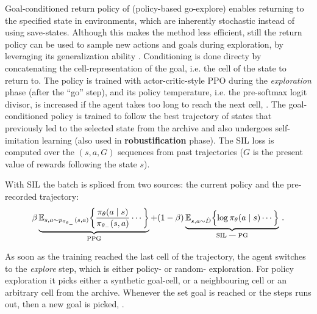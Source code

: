 \documentclass[acmsmall, nonacm]{acmart}
\begin{document}
Goal-conditioned return policy of \citet{ecoffet_first_2021} (policy-based go-explore)
enables returning to the specified state in environments, which are inherently stochastic
instead of using save-states. Although this makes the method less efficient, still
the return policy can be used to sample new actions and goals during exploration, by
leveraging its generalization ability \citep[p.~38]{ecoffet_first_2021}.
% 
Conditioning is done directy by concatenating the cell-representation of the goal, i.e.
the cell of the state to return to.
% 
The policy is trained with actor-critic-style PPO \citep{schulman_proximal_2017} during
the \emph{exploration} phase (after the ``go'' step), and its policy temperature, i.e.
the pre-softmax logit divisor, is increased if the agent takes too long to reach the next cell,
\citep[p.~19]{ecoffet_first_2021}.
% 
The goal-conditioned policy is trained to follow the best trajectory of states that
previously led to the selected state from the archive and also undergoes self-imitation
learning \citep{oh_self-imitation_2018} (also used in \textbf{robustification} phase).
The SIL loss is computed over the $(s, a, G)$ sequences from past trajectories ($G$ is
the present value of rewards following the state $s$).

With SIL the batch is spliced
from two sources: the current policy and the pre-recorded trajectory:
$$
    \beta \underbrace{\mathbb{E}_{s, a\sim p_{\pi_{\theta_-}}(s, a)}
            \biggl\{
                \frac{\pi_\theta(a\mid s)}{\pi_{\theta_-}(s, a)} \cdots
            \biggr\}
    }_{\text{PPG}}
    + (1 - \beta) \underbrace{
        \mathbb{E}_{s, a\sim \hat{D}}
        \Bigl\{
            \log \pi_\theta(a \mid s) \cdots
        \Bigr\}
    }_{\text{SIL --- PG}}
    \,. $$

As soon as the training reached the last cell of the trajectory, the agent switches to
the \emph{explore} step, which is either policy- or random- exploration. For policy
exploration it picks either a synthetic goal-cell, or a neighbouring cell or an arbitrary
cell from the archive. Whenever the set goal is reached or the steps runs out, then a
new goal is picked, \citep[p.~21]{ecoffet_first_2021}.
\end{document}
